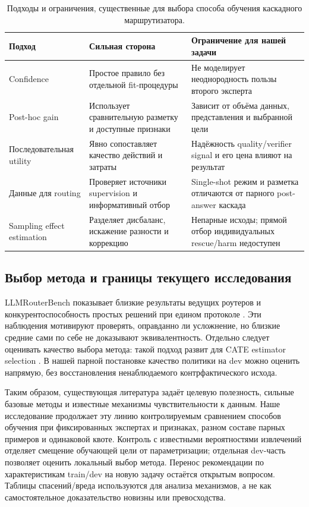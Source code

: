 \begin{table}[htbp]\centering\small
\caption{Подходы и ограничения, существенные для выбора способа
обучения каскадного маршрутизатора.}\label{tab:related_works}
\begin{tabular}{p{.24\linewidth}p{.31\linewidth}p{.36\linewidth}}
\toprule
Подход & Сильная сторона & Ограничение для нашей задачи \\
\midrule
Confidence \citep{jitkrittum2023confidence} &
Простое правило без отдельной fit-процедуры &
Не моделирует неоднородность пользы второго эксперта \\
Post-hoc gain \citep{jitkrittum2023confidence,gupta2024cascades} &
Использует сравнительную разметку и доступные признаки &
Зависит от объёма данных, представления и выбранной цели \\
Последовательная utility \citep{aggarwal2024automix,dekoninck2025unified} &
Явно сопоставляет качество действий и затраты &
Надёжность quality/verifier signal и его цена влияют на результат \\
Данные для routing \citep{ong2025routellm,niu2026routing} &
Проверяет источники supervision и информативный отбор &
Single-shot режим и разметка отличаются от парного post-answer каскада \\
Sampling effect estimation \citep{nyberg2023exploring} &
Разделяет дисбаланс, искажение разности и коррекцию &
Непарные исходы; прямой отбор индивидуальных rescue/harm недоступен \\
\bottomrule
\end{tabular}
\end{table}

\subsection{Выбор метода и границы текущего исследования}
LLMRouterBench показывает близкие результаты ведущих роутеров
и конкурентоспособность простых решений при едином протоколе
\citep{li2026llmrouterbench}. Эти наблюдения мотивируют проверять,
оправданно ли усложнение, но близкие средние сами по себе не доказывают
эквивалентность. Отдельно следует оценивать качество выбора метода:
такой подход развит для CATE estimator selection
\citep{mahajan2024selection}. В нашей парной постановке качество
политики на dev можно оценить напрямую, без восстановления
ненаблюдаемого контрфактического исхода.

Таким образом, существующая литература задаёт целевую полезность,
сильные базовые методы и известные механизмы чувствительности
к данным. Наше исследование продолжает эту линию контролируемым
сравнением способов обучения при фиксированных экспертах и признаках,
разном составе парных примеров и одинаковой квоте. Контроль
с известными вероятностями извлечений отделяет смещение обучающей
цели от параметризации; отдельная dev-часть позволяет оценить
локальный выбор метода. Перенос рекомендации по характеристикам
train/dev на новую задачу остаётся открытым вопросом.
Таблицы спасений/вреда используются для анализа механизмов,
а не как самостоятельное доказательство новизны или превосходства.
